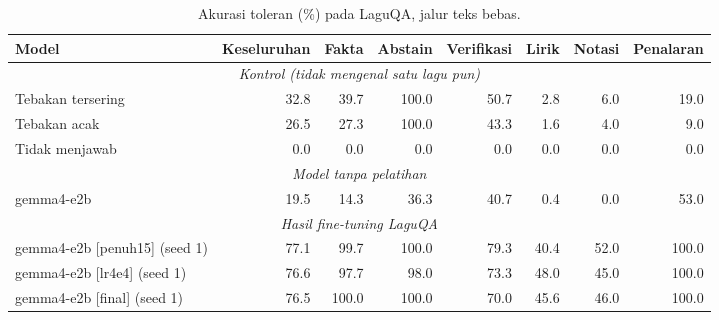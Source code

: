\begin{table}[t]
\centering
\small
\caption{Akurasi toleran (\%) pada LaguQA, jalur teks bebas.}
\begin{tabular}{lrrrrrrr}
\toprule
\textbf{Model} & \textbf{Keseluruhan} & \textbf{Fakta} & \textbf{Abstain} & \textbf{Verifikasi} & \textbf{Lirik} & \textbf{Notasi} & \textbf{Penalaran} \\
\midrule
\multicolumn{8}{c}{\textit{Kontrol (tidak mengenal satu lagu pun)}} \\
Tebakan tersering & 32.8 & 39.7 & 100.0 & 50.7 & 2.8 & 6.0 & 19.0 \\
Tebakan acak & 26.5 & 27.3 & 100.0 & 43.3 & 1.6 & 4.0 & 9.0 \\
Tidak menjawab & 0.0 & 0.0 & 0.0 & 0.0 & 0.0 & 0.0 & 0.0 \\
\midrule
\multicolumn{8}{c}{\textit{Model tanpa pelatihan}} \\
gemma4-e2b & 19.5 & 14.3 & 36.3 & 40.7 & 0.4 & 0.0 & 53.0 \\
\midrule
\multicolumn{8}{c}{\textit{Hasil fine-tuning LaguQA}} \\
gemma4-e2b [penuh15] (seed 1) & 77.1 & 99.7 & 100.0 & 79.3 & 40.4 & 52.0 & 100.0 \\
gemma4-e2b [lr4e4] (seed 1) & 76.6 & 97.7 & 98.0 & 73.3 & 48.0 & 45.0 & 100.0 \\
gemma4-e2b [final] (seed 1) & 76.5 & 100.0 & 100.0 & 70.0 & 45.6 & 46.0 & 100.0 \\
\bottomrule
\end{tabular}
\end{table}

